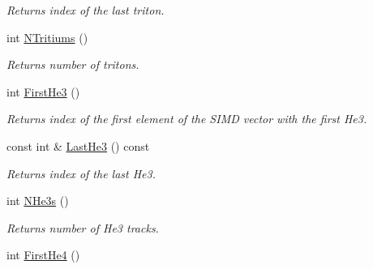 \begin{DoxyCompactItemize}
\begin{DoxyCompactList}\small\item\em Returns index of the last triton. \end{DoxyCompactList}\item 
int \hyperlink{classKFPTrackVector_a2fa9c98d74909310bc752c830325a8df}{N\+Tritiums} ()\hypertarget{classKFPTrackVector_a2fa9c98d74909310bc752c830325a8df}{}\label{classKFPTrackVector_a2fa9c98d74909310bc752c830325a8df}

\begin{DoxyCompactList}\small\item\em Returns number of tritons. \end{DoxyCompactList}\item 
int \hyperlink{classKFPTrackVector_af6bca4e1fa8793bf49bb14de5a2d67e7}{First\+He3} ()\hypertarget{classKFPTrackVector_af6bca4e1fa8793bf49bb14de5a2d67e7}{}\label{classKFPTrackVector_af6bca4e1fa8793bf49bb14de5a2d67e7}

\begin{DoxyCompactList}\small\item\em Returns index of the first element of the S\+I\+MD vector with the first He3. \end{DoxyCompactList}\item 
const int \& \hyperlink{classKFPTrackVector_ae3f6c7a88a1f521e22b93a78722bd772}{Last\+He3} () const \hypertarget{classKFPTrackVector_ae3f6c7a88a1f521e22b93a78722bd772}{}\label{classKFPTrackVector_ae3f6c7a88a1f521e22b93a78722bd772}

\begin{DoxyCompactList}\small\item\em Returns index of the last He3. \end{DoxyCompactList}\item 
int \hyperlink{classKFPTrackVector_a4e9c226487df9d5286cfae6949507106}{N\+He3s} ()\hypertarget{classKFPTrackVector_a4e9c226487df9d5286cfae6949507106}{}\label{classKFPTrackVector_a4e9c226487df9d5286cfae6949507106}

\begin{DoxyCompactList}\small\item\em Returns number of He3 tracks. \end{DoxyCompactList}\item 
int \hyperlink{classKFPTrackVector_a100163d92581e94dab0bae32ec224e9e}{First\+He4} ()\hypertarget{classKFPTrackVector_a100163d92581e94dab0bae32ec224e9e}{}\label{classKFPTrackVector_a100163d92581e94dab0bae32ec224e9e}


\end{DoxyCompactItemize}
